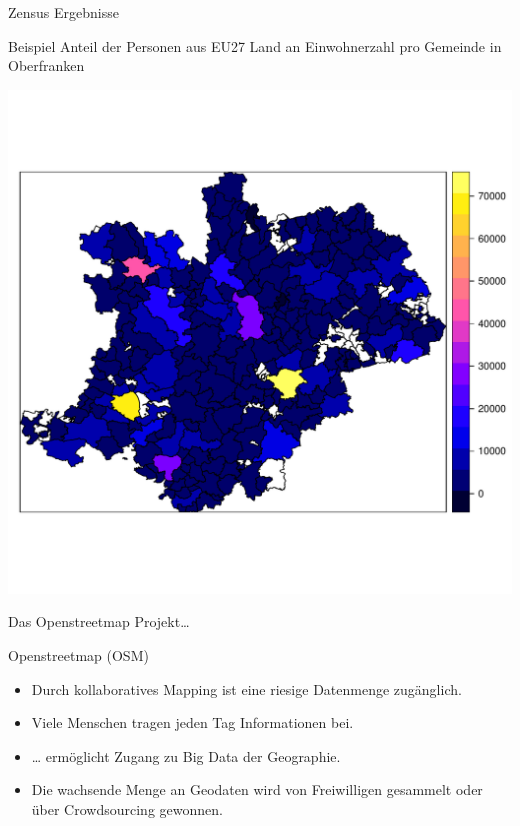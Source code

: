 \documentclass[ignorenonframetext,]{beamer}
\providecommand{\tightlist}{%
  \setlength{\itemsep}{0pt}\setlength{\parskip}{0pt}}
\begin{document}
\begin{frame}{Zensus Ergebnisse}

Beispiel Anteil der Personen aus EU27 Land an Einwohnerzahl pro Gemeinde
in Oberfranken

\includegraphics{figure/KRSBamberg_EWZ.pdf}

\end{frame}

\begin{frame}{Das Openstreetmap Projekt\ldots{}}

\begin{block}{Openstreetmap (OSM)}

\begin{itemize}
\tightlist
\item
  Durch kollaboratives Mapping ist eine riesige Datenmenge zugänglich.
\item
  Viele Menschen tragen jeden Tag Informationen bei.
\item
  \ldots{} ermöglicht Zugang zu Big Data der Geographie.
\item
  Die wachsende Menge an Geodaten wird von Freiwilligen gesammelt oder
  über Crowdsourcing gewonnen.
\end{itemize}

\end{block}

\end{frame}
\end{document}

